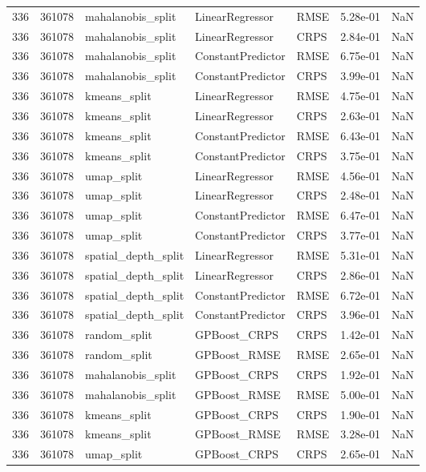 \begin{tabular}{rrlllrr}
336 & 361078 & mahalanobis\_split & LinearRegressor & RMSE & 5.28e-01 & NaN \\
336 & 361078 & mahalanobis\_split & LinearRegressor & CRPS & 2.84e-01 & NaN \\
336 & 361078 & mahalanobis\_split & ConstantPredictor & RMSE & 6.75e-01 & NaN \\
336 & 361078 & mahalanobis\_split & ConstantPredictor & CRPS & 3.99e-01 & NaN \\
336 & 361078 & kmeans\_split & LinearRegressor & RMSE & 4.75e-01 & NaN \\
336 & 361078 & kmeans\_split & LinearRegressor & CRPS & 2.63e-01 & NaN \\
336 & 361078 & kmeans\_split & ConstantPredictor & RMSE & 6.43e-01 & NaN \\
336 & 361078 & kmeans\_split & ConstantPredictor & CRPS & 3.75e-01 & NaN \\
336 & 361078 & umap\_split & LinearRegressor & RMSE & 4.56e-01 & NaN \\
336 & 361078 & umap\_split & LinearRegressor & CRPS & 2.48e-01 & NaN \\
336 & 361078 & umap\_split & ConstantPredictor & RMSE & 6.47e-01 & NaN \\
336 & 361078 & umap\_split & ConstantPredictor & CRPS & 3.77e-01 & NaN \\
336 & 361078 & spatial\_depth\_split & LinearRegressor & RMSE & 5.31e-01 & NaN \\
336 & 361078 & spatial\_depth\_split & LinearRegressor & CRPS & 2.86e-01 & NaN \\
336 & 361078 & spatial\_depth\_split & ConstantPredictor & RMSE & 6.72e-01 & NaN \\
336 & 361078 & spatial\_depth\_split & ConstantPredictor & CRPS & 3.96e-01 & NaN \\
336 & 361078 & random\_split & GPBoost\_CRPS & CRPS & 1.42e-01 & NaN \\
336 & 361078 & random\_split & GPBoost\_RMSE & RMSE & 2.65e-01 & NaN \\
336 & 361078 & mahalanobis\_split & GPBoost\_CRPS & CRPS & 1.92e-01 & NaN \\
336 & 361078 & mahalanobis\_split & GPBoost\_RMSE & RMSE & 5.00e-01 & NaN \\
336 & 361078 & kmeans\_split & GPBoost\_CRPS & CRPS & 1.90e-01 & NaN \\
336 & 361078 & kmeans\_split & GPBoost\_RMSE & RMSE & 3.28e-01 & NaN \\
336 & 361078 & umap\_split & GPBoost\_CRPS & CRPS & 2.65e-01 & NaN \\

\end{tabular}
